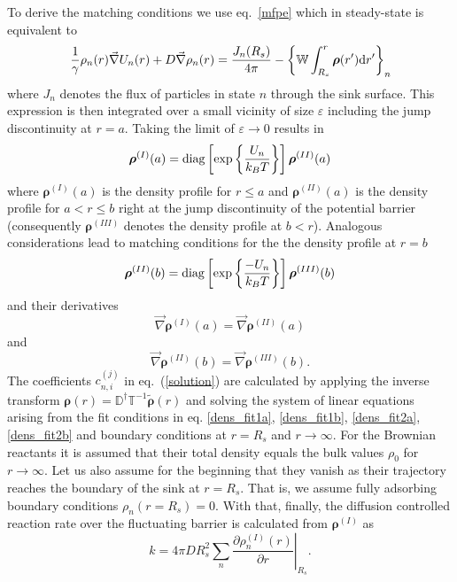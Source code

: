 \documentclass[preprint,superscriptaddress]{revtex4-1}
\newcommand{\vect}[1]{\boldsymbol{\mathbf{#1}}}
\begin{document}
To derive the matching conditions we use eq.~\eqref{mfpe} which in steady-state is equivalent to
\begin{equation*}
     \frac{1}{\gamma}\rho_n(r) \vec{\nabla} U_n(r) + D \vec{\nabla} \rho_n(r) = \frac{J_n(R_s)}{4 \pi} - \left\{ \mathbb{W} \int_{R_s}^{r} \vect{\rho}(r') {\rm d} r' \right\}_{n}
\end{equation*}
where $J_n$ denotes the flux of particles in state $n$ through the sink surface. This expression is then integrated over a small vicinity of size $\varepsilon$ including the jump discontinuity at $r = a$. Taking the limit of $\varepsilon \rightarrow 0$ results in 
\begin{equation}
    \vect{\rho}^{(I)}(a) = {\rm diag}\left[\exp\left\{\frac{U_n}{k_B T} \right\}\right]\vect{\rho}^{(II)}(a)
    \label{dens_fit1a}
\end{equation}
where $\vect{\rho}^{(I)}(a)$ is the density profile for $r \le a$ and $\vect{\rho}^{(II)}(a)$ is the density profile for $ a<r\le b$ right at the jump discontinuity of the potential barrier (consequently $\vect{\rho}^{(III)}$ denotes the density profile at $b<r$). 
Analogous considerations lead to matching conditions for the the density profile at $r=b$
\begin{equation}
    \vect{\rho}^{(II)}(b) = {\rm diag}\left[\exp\left\{\frac{-U_n}{k_B T} \right\}\right]\vect{\rho}^{(III)}(b)
    \label{dens_fit1b}
\end{equation}
and their derivatives
\begin{equation}
    \vec{\nabla}\vect{\rho}^{(I)}(a) =\vec{\nabla}\vect{\rho}^{(II)}(a) 
    \label{dens_fit2a}
\end{equation}
and
\begin{equation}
    \vec{\nabla}\vect{\rho}^{(II)}(b) =\vec{\nabla}\vect{\rho}^{(III)}(b). 
    \label{dens_fit2b}
\end{equation}
The coefficients $c_{n,i}^{(j)}$ in eq.~(\ref{solution}) are calculated by applying the inverse transform $\vect{\rho}(r) = \mathbb{D}^{\dagger}\mathbb{T}^{-1}\tilde{\vect{\rho}}(r)$ and solving the system of linear equations arising from the fit conditions in eq. \eqref{dens_fit1a}, \eqref{dens_fit1b}, \eqref{dens_fit2a}, \eqref{dens_fit2b} and boundary conditions at $r=R_s$ and $r \rightarrow \infty$. For the Brownian reactants it is assumed that their total density equals the bulk values $\rho_0$ for $r \rightarrow \infty$. Let us also assume for the beginning that they vanish as their trajectory reaches the boundary of the sink at $r = R_s$. That is, we assume fully adsorbing boundary conditions $\rho_n(r=R_s)=0$.  
With that, finally, the diffusion controlled reaction rate over the fluctuating barrier is calculated from $\vect{\rho}^{(I)}$ as
\begin{equation}
    k = 4 \pi D R_s^{2}\sum_n \left. \frac{\partial \rho_n^{(I)}(r)}{\partial r} \right|_{R_s}.
    \label{rate_konstant}
\end{equation}
\end{document}
